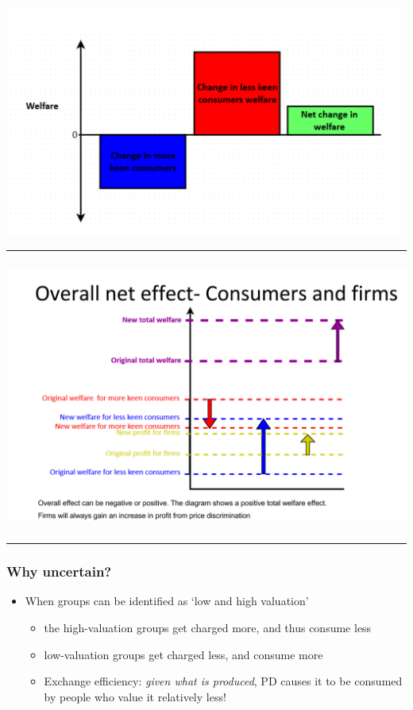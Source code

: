 \documentclass[]{article}
\providecommand{\tightlist}{%
  \setlength{\itemsep}{0pt}\setlength{\parskip}{0pt}}
\begin{document}
\includegraphics[height=3in]{picsfigs/pdwelfare.png}

\begin{center}\rule{0.5\linewidth}{\linethickness}\end{center}

\includegraphics[height=3.5in]{picsfigs/pdwelfareoverall.png}

\begin{center}\rule{0.5\linewidth}{\linethickness}\end{center}

\hypertarget{why-uncertain}{%
\subsubsection{Why uncertain?}\label{why-uncertain}}

\begin{itemize}
\tightlist
\item
  When groups can be identified as `low and high valuation'

  \begin{itemize}
  \tightlist
  \item
    the high-valuation groups get charged more, and thus consume less
  \item
    low-valuation groups get charged less, and consume more
  \item
    Exchange efficiency: \emph{given what is produced}, PD causes it to
    be consumed by people who value it relatively less!
  \end{itemize}
\end{itemize}
\end{document}
